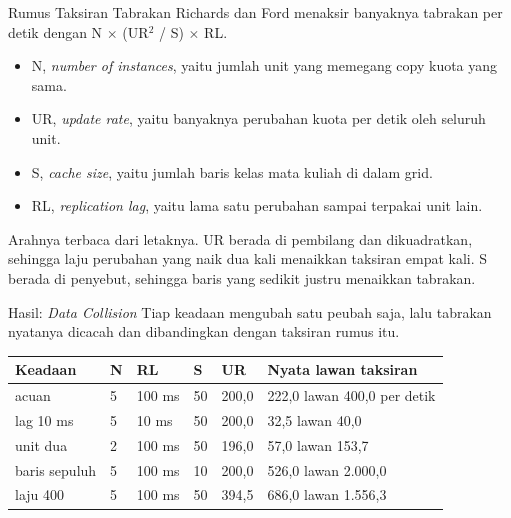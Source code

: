 \documentclass[aspectratio=169, table, 12pt]{beamer}
\begin{document}
\begin{frame}{{\Large Rumus Taksiran Tabrakan}}
  \vspace{6pt}
  {\small Richards dan Ford menaksir banyaknya tabrakan per detik dengan
  N $\times$ (UR$^2$ / S) $\times$ RL.}

  \vspace{6pt}
  \begin{itemize}\small
    \item N, \textit{number of instances}, yaitu jumlah unit yang memegang
          copy kuota yang sama.
    \item UR, \textit{update rate}, yaitu banyaknya perubahan kuota per detik
          oleh seluruh unit.
    \item S, \textit{cache size}, yaitu jumlah baris kelas mata kuliah di
          dalam grid.
    \item RL, \textit{replication lag}, yaitu lama satu perubahan sampai
          terpakai unit lain.
  \end{itemize}

  \vspace{6pt}
  {\small Arahnya terbaca dari letaknya. UR berada di pembilang dan
  dikuadratkan, sehingga laju perubahan yang naik dua kali menaikkan taksiran
  empat kali. S berada di penyebut, sehingga baris yang sedikit justru
  menaikkan tabrakan.}
\end{frame}

\begin{frame}{{\Large Hasil: \textit{Data Collision}}}
  \vspace{6pt}
  {\small Tiap keadaan mengubah satu peubah saja, lalu tabrakan nyatanya
  dicacah dan dibandingkan dengan taksiran rumus itu.}

  \vspace{6pt}
  \centering
  \small
  \begin{tabularx}{0.96\textwidth}{|l|l|l|l|l|X|}
    \hline
    \textbf{Keadaan} & \textbf{N} & \textbf{RL} & \textbf{S} & \textbf{UR} & \textbf{Nyata lawan taksiran} \\
    \hline
    acuan & 5 & 100 ms & 50 & 200,0 & 222,0 lawan 400,0 per detik \\
    \hline
    lag 10 ms & 5 & 10 ms & 50 & 200,0 & 32,5 lawan 40,0 \\
    \hline
    unit dua & 2 & 100 ms & 50 & 196,0 & 57,0 lawan 153,7 \\
    \hline
    baris sepuluh & 5 & 100 ms & 10 & 200,0 & 526,0 lawan 2.000,0 \\
    \hline
    laju 400 & 5 & 100 ms & 50 & 394,5 & 686,0 lawan 1.556,3 \\
    \hline
  \end{tabularx}
\end{frame}
\end{document}
